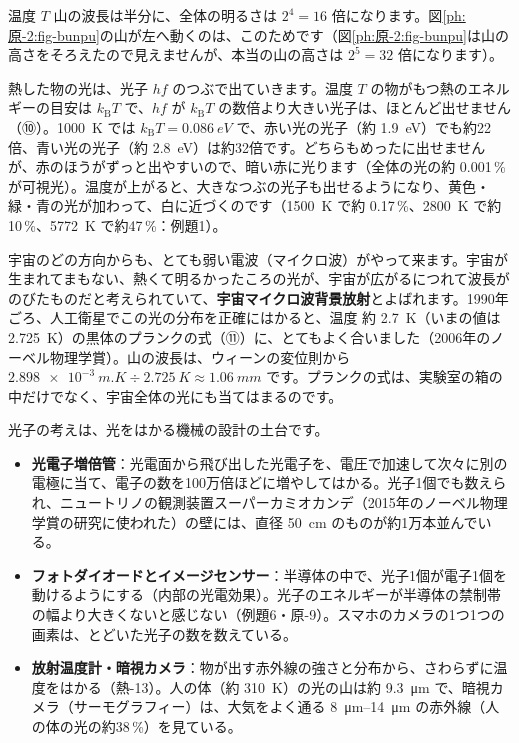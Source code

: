 \begin{phbaisuru}{温度 $T$}
山の波長は半分に、全体の明るさは $2^4=16$ 倍になります。図\ref{ph:原-2:fig-bunpu}の山が左へ動くのは、このためです（図\ref{ph:原-2:fig-bunpu}は山の高さをそろえたので見えませんが、本当の山の高さは $2^5=32$ 倍になります）。
\end{phbaisuru}

\label{ph:原-2:hatena}熱した物の光は、光子 $hf$ のつぶで出ていきます。温度 $T$ の物がもつ熱のエネルギーの目安は $k_{\mathrm B}T$ で、$hf$ が $k_{\mathrm B}T$ の数倍より大きい光子は、ほとんど出せません（⑩）。\qty{1000}{K} では $k_{\mathrm B}T=\qty{0.086}{eV}$ で、赤い光の光子（約 \qty{1.9}{eV}）でも約22倍、青い光の光子（約 \qty{2.8}{eV}）は約32倍です。どちらもめったに出せませんが、赤のほうがずっと出やすいので、暗い赤に光ります（全体の光の約 0.001\,\% が可視光）。温度が上がると、大きなつぶの光子も出せるようになり、黄色・緑・青の光が加わって、白に近づくのです（\qty{1500}{K} で約 0.17\,\%、\qty{2800}{K} で約10\,\%、\qty{5772}{K} で約47\,\%：例題1）。

\begin{motto}[4]
宇宙のどの方向からも、とても弱い電波（マイクロ波）がやって来ます。宇宙が生まれてまもない、熱くて明るかったころの光が、宇宙が広がるにつれて波長がのびたものだと考えられていて、\textbf{宇宙マイクロ波背景放射}とよばれます。1990年ごろ、人工衛星でこの光の分布を正確にはかると、温度 約 \qty{2.7}{K}（いまの値は \qty{2.725}{K}）の黒体のプランクの式（⑪）に、とてもよく合いました（2006年のノーベル物理学賞）。山の波長は、ウィーンの変位則から $\qty{2.898e-3}{m.K}\div\qty{2.725}{K}\approx\qty{1.06}{mm}$ です。プランクの式は、実験室の箱の中だけでなく、宇宙全体の光にも当てはまるのです。
\end{motto}

\label{ph:原-2:sec12}
光子の考えは、光をはかる機械の設計の土台です。
\begin{itemize}[leftmargin=1.2\zw, itemsep=2pt, topsep=2pt, label={\color{bkTheme}●}]
\item \textbf{光電子増倍管}：光電面から飛び出した光電子を、電圧で加速して次々に別の電極に当て、電子の数を100万倍ほどに増やしてはかる。光子1個でも数えられ、ニュートリノの観測装置スーパーカミオカンデ（2015年のノーベル物理学賞の研究に使われた）の壁には、直径 \qty{50}{cm} のものが約1万本並んでいる。
\item \textbf{フォトダイオードとイメージセンサー}：半導体の中で、光子1個が電子1個を動けるようにする（内部の光電効果）。光子のエネルギーが半導体の禁制帯の幅より大きくないと感じない（例題6・原-9）。スマホのカメラの1つ1つの画素は、とどいた光子の数を数えている。
\item \textbf{放射温度計・暗視カメラ}：物が出す赤外線の強さと分布から、さわらずに温度をはかる（熱-13）。人の体（約 \qty{310}{K}）の光の山は約 \qty{9.3}{\micro m} で、暗視カメラ（サーモグラフィー）は、大気をよく通る \qtyrange{8}{14}{\micro m} の赤外線（人の体の光の約38\,\%）を見ている。
\end{itemize}

